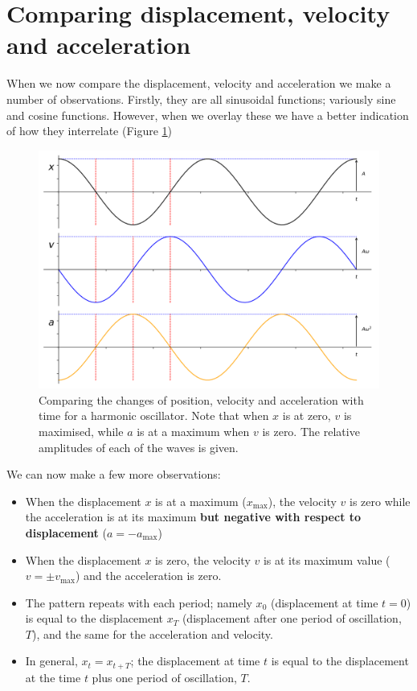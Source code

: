 \documentclass[
]{book}
\providecommand{\tightlist}{%
  \setlength{\itemsep}{0pt}\setlength{\parskip}{0pt}}
\begin{document}
\hypertarget{sec:shm-comparing-xva}{%
\section{Comparing displacement, velocity and acceleration}\label{sec:shm-comparing-xva}}

When we now compare the displacement, velocity and acceleration we make a number of observations. Firstly, they are all sinusoidal functions; variously sine and cosine functions. However, when we overlay these we have a better indication of how they interrelate (Figure \ref{fig:shm-general-comparison-xva})

\begin{figure}

{\centering \includegraphics[width=0.7\linewidth]{visualisations/ch1-xvacomp} 

}

\caption{Comparing the changes of position, velocity and acceleration with time for a harmonic oscillator. Note that when $x$ is at zero, $v$ is maximised, while $a$ is at a maximum when $v$ is zero. The relative amplitudes of each of the waves is given.}\label{fig:shm-general-comparison-xva}
\end{figure}

We can now make a few more observations:

\begin{itemize}
\tightlist
\item
  When the displacement \(x\) is at a maximum (\(x_\textrm{max}\)), the velocity \(v\) is zero while the acceleration is at its maximum \textbf{but negative with respect to displacement} (\(a= -a_\textrm{max}\))
\item
  When the displacement \(x\) is zero, the velocity \(v\) is at its maximum value (\(v = \pm v_\textrm{max}\)) and the acceleration is zero.
\item
  The pattern repeats with each period; namely \(x_0\) (displacement at time \(t = 0\)) is equal to the displacement \(x_T\) (displacement after one period of oscillation, \(T\)), and the same for the acceleration and velocity.
\item
  In general, \(x_t = x_{t+T}\); the displacement at time \(t\) is equal to the displacement at the time \(t\) plus one period of oscillation, \(T\).
\end{itemize}
\end{document}

